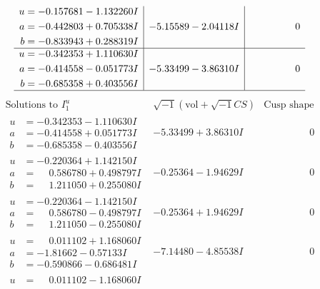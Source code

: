 \documentclass[1p]{elsarticle_modified}
\theoremstyle{definition}
\newcommand{\I}{\sqrt{-1}}
\begin{document}
$$\begin{array}{c|c|c}
\begin{aligned}
u &= -0.157681 - 1.132260 I \\
a &= -0.442803 + 0.705338 I \\
b &= -0.833943 + 0.288319 I\end{aligned}
 & -5.15589 - 2.04118 I & \phantom{-0.000000 } 0 \\ \hline\begin{aligned}
u &= -0.342353 + 1.110630 I \\
a &= -0.414558 - 0.051773 I \\
b &= -0.685358 + 0.403556 I\end{aligned}
 & -5.33499 - 3.86310 I & \phantom{-0.000000 } 0\\
 \hline 
 \end{array}$$\newpage$$\begin{array}{c|c|c}  
\text{Solutions to }I^u_{1}& \I (\text{vol} + \sqrt{-1}CS) & \text{Cusp shape}\\
 \hline 
\begin{aligned}
u &= -0.342353 - 1.110630 I \\
a &= -0.414558 + 0.051773 I \\
b &= -0.685358 - 0.403556 I\end{aligned}
 & -5.33499 + 3.86310 I & \phantom{-0.000000 } 0 \\ \hline\begin{aligned}
u &= -0.220364 + 1.142150 I \\
a &= \phantom{-}0.586780 + 0.498797 I \\
b &= \phantom{-}1.211050 + 0.255080 I\end{aligned}
 & -0.25364 - 1.94629 I & \phantom{-0.000000 } 0 \\ \hline\begin{aligned}
u &= -0.220364 - 1.142150 I \\
a &= \phantom{-}0.586780 - 0.498797 I \\
b &= \phantom{-}1.211050 - 0.255080 I\end{aligned}
 & -0.25364 + 1.94629 I & \phantom{-0.000000 } 0 \\ \hline\begin{aligned}
u &= \phantom{-}0.011102 + 1.168060 I \\
a &= -1.81662 - 0.57133 I \\
b &= -0.590866 - 0.686481 I\end{aligned}
 & -7.14480 - 4.85538 I & \phantom{-0.000000 } 0 \\ \hline\begin{aligned}
u &= \phantom{-}0.011102 - 1.168060 I \\

\end{aligned}
\end{array}$$
\end{document}
